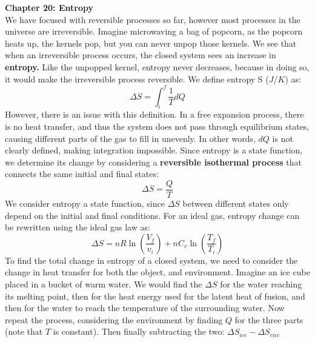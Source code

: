 \documentclass[11pt]{article}
\begin{document}
    \noindent \textbf{Chapter 20: Entropy }%
    \\ \noindent \newline We have focused with reversible processes so far,
    however most processes in the universe are irreversible.
    Imagine microwaving a bag of popcorn, as the popcorn heats up,
    the kernels pop, but you can never unpop those kernels.
    We see that when an irreversible process occurs,
    the closed system sees an increase in \textbf{entropy.}
    Like the unpopped kernel, entropy never decreases, because in doing so,
    it would make the irreversible process reversible.
    We define entropy S ($J/K$) as:
    \begin{equation}
        \Delta S = \int_{i}^f \frac{1}{T} dQ \tag{entropy}
    \end{equation}
    However, there is an issue with this definition.
    In a free expansion process, there is no heat transfer,
    and thus the system does not pass through equilibrium states,
    causing different parts of the gas to fill in unevenly.
    In other words, $dQ$ is not clearly defined, making integration impossible.
    Since entropy is a state function,
    we determine its change by considering a
    \textbf{reversible isothermal process}
    that connects the same initial and final states:
    \begin{equation}
        \Delta S = \frac{Q}{T} \tag{entropy, isothermal process}
    \end{equation}
    We consider entropy a state function, since $\Delta S$ between different states only
    depend on the initial and final conditions.
    For an ideal gas, entropy change can be rewritten using the ideal gas law as:
    \begin{equation}
        \Delta S = nR\ln (\frac{V_f}{v_i}) + nC_v \ln (\frac{T_f}{T_i}) \tag{all procresses}
    \end{equation}
    To find the total change in entropy of a closed system,
    we need to consider the change in heat transfer for both the object, and environment.
    Imagine an ice cube placed in a bucket of warm water.
    We would find the $\Delta S$ for the water reaching its melting point,
    then for the heat energy used for the latent heat of fusion, and then for the water
    to reach the temperature of the surrounding water.
    Now repeat the process, considering the environment by finding $Q$ for the three parts (note that $T$ is constant).
    Then finally subtracting the two: $\Delta S_{ice} - \Delta S_{env}$
\end{document}
